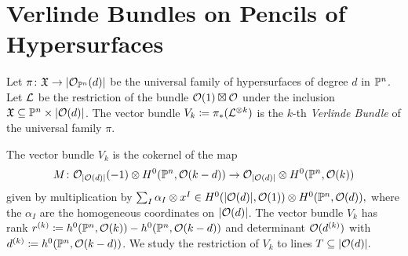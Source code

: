 \section{Verlinde Bundles on Pencils of Hypersurfaces}

\newcommand{\schemeofsurfaces}[1][d]{\abs{\mc{O}(#1)}}
\newcommand{\divides}{\mid}

\begin{definition}
Let $\pi\colon \mathfrak{X} \to \lvert\mathcal{O}_{\mathbb{P}^n}(d)\rvert$ be the universal family of hypersurfaces of degree $d$ in $\mathbb{P}^n$. Let $\mathcal{L}$ be the restriction of the bundle $\mathcal{O}(1)\boxtimes \mathcal{O}$ under the inclusion $\mf X \subseteq \PP^n \times \schemeofsurfaces$. The vector bundle $V_k \coloneqq \pi_{*} (\mathcal{L}^{\otimes k})$ is the $k$-th \emph{Verlinde Bundle} of the universal family $\pi$.
\end{definition}
The vector bundle $V_k$ is the cokernel of the map
\[
M \from \mc{O}_{\schemeofsurfaces}(-1)
\otimes H^0(\PP^n,\mc{O}(k-d))
	\to \mc{O}_{\schemeofsurfaces} \otimes H^0(\PP^n,\mc{O}(k))
\]
given by multiplication by
$\sum_I \alpha_I \otimes x^I
\in H^0(\schemeofsurfaces,\mc{O}(1)) \otimes H^0(\PP^n,\mc{O}(d)),$ where the $\alpha_I$ are the homogeneous coordinates on $\schemeofsurfaces$. The vector bundle $V_k$ has rank $r^{(k)}\coloneqq h^0(\mathbb{P}^n, \mathcal{O}(k))-h^0(\mathbb{P}^n, \mathcal{O}(k-d))$ and determinant $\mathcal{O}(d^{(k)})$ with $d^{(k)}\coloneqq h^0(\mathbb{P}^n,\mathcal{O}(k-d))$.
We study the restriction of $V_k$ to lines $T\subseteq \schemeofsurfaces.$






